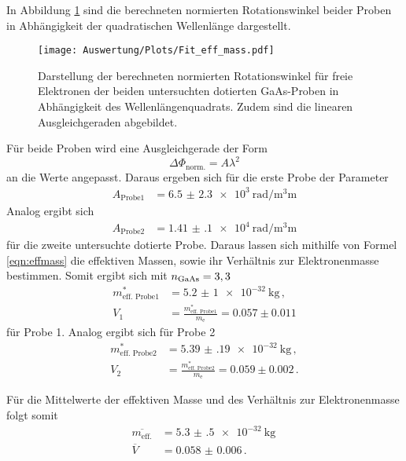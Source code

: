 In Abbildung \ref{fig:beideProben} sind die berechneten normierten Rotationswinkel beider Proben in
Abhängigkeit der quadratischen Wellenlänge dargestellt.
\begin{figure}[H]
  \centering
  \texttt{[image: Auswertung/Plots/Fit\_eff\_mass.pdf]}
  \caption{Darstellung der berechneten normierten Rotationswinkel für freie Elektronen der beiden untersuchten
  dotierten GaAs-Proben in Abhängigkeit des Wellenlängenquadrats. Zudem sind die linearen
  Ausgleichgeraden abgebildet.}
  \label{fig:beideProben}
\end{figure} \noindent
Für beide Proben wird eine Ausgleichgerade der
Form
\begin{equation*}
  \Delta \Phi_\text{norm.} = A \lambda^2
\end{equation*} \noindent
an die Werte angepasst. Daraus ergeben sich für die erste Probe der Parameter
\begin{align*}
  A_\text{Probe1} &= \SI{6.5(23)e3}{\radian\per\cubic\milli\meter}
\end{align*} \noindent
Analog ergibt sich
\begin{align*}
  A_\text{Probe2} &= \SI{1.41(10)e4}{\radian\per\cubic\milli\meter}
\end{align*} \noindent
für die zweite untersuchte dotierte Probe. Daraus lassen sich mithilfe von Formel \eqref{eqn:effmass}
die effektiven Massen, sowie ihr Verhältnis zur Elektronenmasse bestimmen. Somit ergibt sich mit $n_\text{\ce{GaAs}} = 3,3$ \cite{n_GaAs}
\begin{align*}
  m_\text{eff. Probe1}^* &= \SI{5.2(10)e-32}{\kilo\gram}\, , \\
  V_1 &= \frac{m_\text{eff. Probe1}^*}{m_\text{e}} = 0.057 \pm 0.011
\end{align*}
für Probe 1. Analog ergibt sich für Probe 2
\begin{align*}
  m_\text{eff. Probe2}^* &= \SI{5.39(19)e-32}{\kilo\gram} \, , \\
  V_2 &= \frac{m_\text{eff. Probe2}^*}{m_\text{e}} = 0.059 \pm 0.002 \,.
\end{align*} \noindent

Für die Mittelwerte der effektiven Masse und des Verhältnis zur Elektronenmasse folgt somit
\begin{align}
  \overline{m_\text{eff.}} &= \SI{5.3(5)e-32}{\kilo\gram} \nonumber \, \\
  \overline{V} &= \num{0.058(6)} \, .
  \label{eqn:V_eff}
\end{align}
